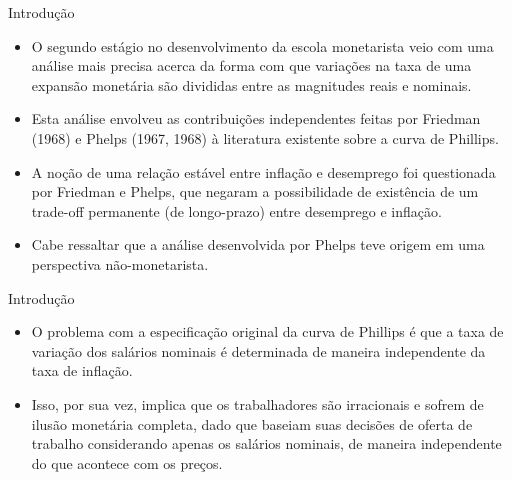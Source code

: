 \documentclass[10pt]{beamer}
\begin{document}
\begin{frame}{Introdução}
    \begin{itemize}
        \item O segundo estágio no desenvolvimento da escola monetarista veio com uma análise mais precisa acerca da forma com que variações na taxa de uma expansão monetária são divididas entre as magnitudes reais e nominais.
        \bigskip
        \item Esta análise envolveu as contribuições independentes feitas por Friedman (1968) e Phelps (1967, 1968) à literatura existente sobre a curva de Phillips.
        \bigskip
        \item A noção  de uma relação estável entre inflação e desemprego foi questionada por Friedman e Phelps, que negaram a possibilidade de existência de um trade-off permanente (de longo-prazo) entre desemprego e inflação.
        \bigskip
        \item Cabe ressaltar que a análise desenvolvida por Phelps teve origem em uma perspectiva não-monetarista.
    \end{itemize}
\end{frame}

\begin{frame}{Introdução}
    \begin{itemize}
        \item O problema com a especificação original da curva de Phillips é que a taxa de variação dos salários nominais é determinada de maneira independente da taxa de inflação.
        \bigskip
        \item Isso, por sua vez, implica que os trabalhadores são irracionais e sofrem de ilusão monetária completa, dado que baseiam suas decisões de oferta de trabalho considerando apenas os salários nominais, de maneira independente do que acontece com os preços.
    \end{itemize}
\end{frame}
\end{document}
